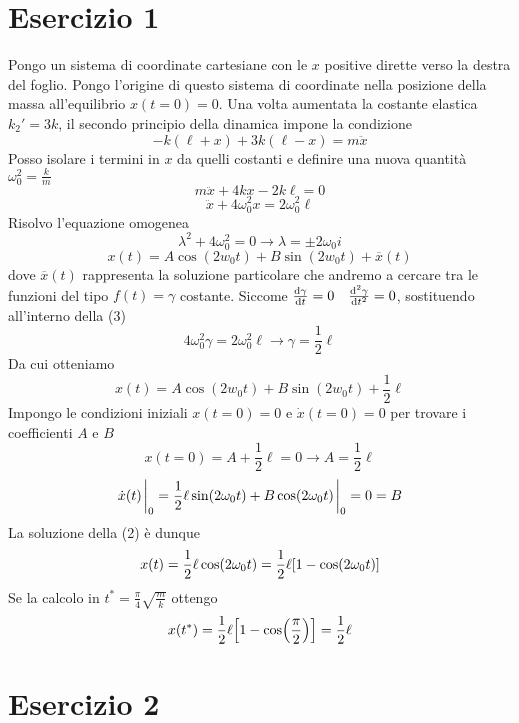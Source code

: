 \documentclass{scrartcl}
\begin{document}
\section*{Esercizio 1}
Pongo un sistema di coordinate cartesiane con le \(x\) positive dirette verso la destra del foglio.
Pongo l'origine di questo sistema di coordinate nella posizione della massa all'equilibrio \(x(t=0) = 0\).
Una volta aumentata la costante elastica \(k_2' = 3k\), il secondo principio della dinamica impone la condizione
\begin{equation}
    -k(\ell+x)+ 3k(\ell-x) = m \ddot{x}
\end{equation}
Posso isolare i termini in \(x\) da quelli costanti e definire una nuova quantità \(\omega_0^2 = \frac{k}{m}\)
\[
    m\ddot{x} + 4kx -2k\ell = 0
\]
\begin{equation}
    \ddot{x} + 4 \omega_0^2 x = 2 \omega_0^2\ell
\end{equation}
Risolvo l'equazione omogenea 
\[
    \lambda^2 +4\omega_0^2 = 0 \longrightarrow \lambda = \pm 2 \omega_0 i
\]
\begin{equation}
    x(t) = A\cos(2w_0t) + B\sin(2w_0t) + \overline{x}(t)
\end{equation}
dove \(\overline{x}(t)\) rappresenta la soluzione particolare che andremo a cercare tra le funzioni del tipo \(f(t) = \gamma\) costante.
Siccome \(\dv{\gamma}{t} = 0 \quad \dv[2]{\gamma}{t} = 0\), sostituendo all'interno della (3)
\[4\omega_0^2 \gamma = 2\omega_0^2 \ell \longrightarrow \gamma = \frac{1}{2}\ell\]
Da cui otteniamo
\begin{equation}
    x(t) = A\cos(2w_0t) + B\sin(2w_0t) + \frac{1}{2}\ell
\end{equation}
Impongo le condizioni iniziali \(x(t=0) = 0\) e \(\dot{x}(t=0) = 0\) per trovare i coefficienti \(A\) e \(B\)
\[x(t=0) = A +\frac{1}{2}\ell = 0 \longrightarrow A = \frac{1}{2}\ell\]
\[\dot x(t)\eval_{0} = \frac{1}{2}\ell \sin(2\omega_0 t) + B \cos(2\omega_0 t) \eval_{0} = 0 = B\]
La soluzione della (2) è dunque 
\begin{equation}
    x(t) = \frac{1}{2}\ell \cos(2\omega_0 t) = \frac{1}{2}\ell \qty[1-\cos(2\omega_0 t)]
\end{equation}
Se la calcolo in \(t^* = \frac{\pi}{4}\sqrt{\frac{m}{k}}\) ottengo
\begin{equation}
    x(t^*) = \frac{1}{2}\ell \qty[1-\cos(\frac{\pi}{2})] = \frac{1}{2}\ell
\end{equation}

\section*{Esercizio 2}
\end{document}
